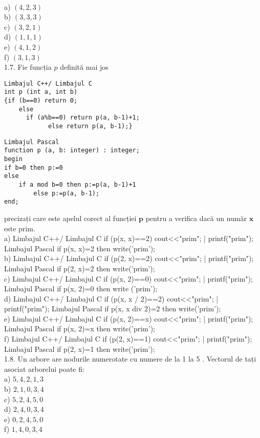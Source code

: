 \\
a) $(4,2,3)$
\\
b) $(3,3,3)$
\\
c) $(3,2,1)$
\\
d) $(1,1,1)$
\\
e) $(4,1,2)$
\\
f) $(3,1,3)$
\\
1.7. Fie funcția $p$ definită mai jos
\begin{verbatim}
Limbajul C++/ Limbajul C
int p (int a, int b)
{if (b==0) return 0;
    else
      if (a%b==0) return p(a, b-1)+1;
            else return p(a, b-1);}
\end{verbatim}
\begin{verbatim}
Limbajul Pascal
function p (a, b: integer) : integer;
begin
if b=0 then p:=0
else
    if a mod b=0 then p:=p(a, b-1)+1
        else p:=p(a, b-1);
end;
\end{verbatim}
precizați care este apelul corect al funcției $\mathbf{p}$ pentru a verifica dacă un număr $\mathbf{x}$ este prim.
\\
a) Limbajul C++/ Limbajul C
if (p(x, x)==2)  cout<<"prim"; | printf("prim");
Limbajul Pascal
if p(x, x)=2 then write('prim');
\\
b) Limbajul C++/ Limbajul C
if (p(2, x)==2)  cout<<"prim"; | printf("prim");
Limbajul Pascal
if p(2, x)=2 then write('prim');
\\
c) Limbajul C++/ Limbajul C
if (p(x, 2)==0)  cout<<"prim"; | printf("prim");
Limbajul Pascal
if p(x, 2)=0 then write ('prim');
\\
d) Limbajul C++/ Limbajul C
if (p(x, x / 2)==2) cout<<"prim"; | printf("prim");
Limbajul Pascal
if p(x, x div 2)=2 then write('prim');
\\
e) Limbajul C++/ Limbajul C
if (p(x, 2)==x) cout<<"prim"; | printf("prim");
Limbajul Pascal
if p(x, 2)=x then write('prim');
\\
f) Limbajul C++/ Limbajul C
if (p(2, x)==1) cout<<"prim";  | printf("prim");
Limbajul Pascal
if p(2, x)=1 then write('prim');
\\
1.8. Un arbore are nodurile numerotate cu numere de la 1 la 5 . Vectorul de tați asociat arborelui poate fi:
\\
a) $5,4,2,1,3$
\\
b) $2,1,0,3,4$
\\
c) $5,2,4,5,0$
\\
d) $2,4,0,3,4$
\\
e) $0,2,4,5,0$
\\
f) $1,4,0,3,4$
\\
